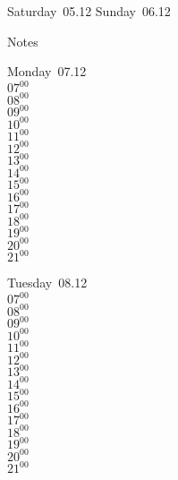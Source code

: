 \documentclass[11pt,a4paper]{book}\usepackage[]{graphicx}\usepackage[]{color}
\begin{document}
\begin{weekendbox}
  Saturday~05.12
  \tcblower
  Sunday~06.12
\end{weekendbox} %
\begin{notebox}
  Notes
\end{notebox}
\clearpage
\begin{headerbox}
\end{headerbox}
\begin{weekdaybox}
  Monday~07.12\\
  { 
  \vfill
  $07^{00}$\\
$08^{00}$\\
$09^{00}$\\
$10^{00}$\\
$11^{00}$\\
$12^{00}$\\
$13^{00}$\\
$14^{00}$\\
$15^{00}$\\
$16^{00}$\\
$17^{00}$\\
$18^{00}$\\
$19^{00}$\\
$20^{00}$\\
$21^{00}$\\
  }
\end{weekdaybox}
\begin{weekdaybox}
  Tuesday~08.12\\
  { 
  \vfill
  $07^{00}$\\
$08^{00}$\\
$09^{00}$\\
$10^{00}$\\
$11^{00}$\\
$12^{00}$\\
$13^{00}$\\
$14^{00}$\\
$15^{00}$\\
$16^{00}$\\
$17^{00}$\\
$18^{00}$\\
$19^{00}$\\
$20^{00}$\\
$21^{00}$\\
  }
\end{weekdaybox}
\end{document}
